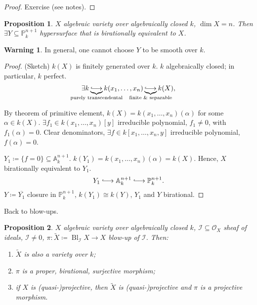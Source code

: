 \documentclass[12pt]{article}
\DeclareMathOperator{\Bl}{Bl}
\newtheorem*{proposition}{Proposition}
\theoremstyle{definition}
\newtheorem*{warning}{Warning}
\begin{document}
\begin{proof}
Exercise (see notes).
\end{proof}

\begin{proposition}
$X$ algebraic variety over algebraically closed $k$, $\dim X=n$. Then $\exists Y\subseteq\mathbb P_k^{n+1}$ hypersurface that is birationally equivalent to $X$.
\end{proposition}

\begin{warning}
In general, one cannot choose $Y$ to be smooth over $k$.
\end{warning}

\begin{proof}
(Sketch) $k(X)$ is finitely generated over $k$. $k$ algebraically closed; in particular, $k$ perfect.
\[\exists k\underbrace{\lhook\joinrel\longrightarrow}_{\mathclap{\text{purely transcendental}}}k(x_1,\ldots,x_n)\underbrace{\lhook\joinrel\longrightarrow}_{\mathclap{\text{finite \& separable}}}k(X),\]

By theorem of primitive element, $k(X)=k(x_1,\ldots,x_n)(\alpha)$ for some $\alpha\in k(X)$. $\exists f_1\in k(x_1,\ldots,x_n)[y]$ irreducible polynomial, $f_1\neq0$, with $f_1(\alpha)=0$. Clear denominators, $\exists f\in k[x_1,\ldots,x_n,y]$ irreducible polynomial, $f(\alpha)=0$.

$Y_1\coloneqq\{f=0\}\subseteq\mathbb A_k^{n+1}$. $k(Y_1)=k(x_1,\ldots,x_n)(\alpha)=k(X)$. Hence, $X$ birationally equivalent to $Y_1$.
\[Y_1\lhook\joinrel\longrightarrow\mathbb A_k^{n+1}\lhook\joinrel\longrightarrow\mathbb P_k^{n+1}.\]
$Y\coloneqq\overline{Y_1}$ closure in $\mathbb P_k^{n+1}$, $k(Y_1)\cong k(Y)$, $Y_1$ and $Y$ birational.
\end{proof}

Back to blow-ups.

\begin{proposition}
$X$ algebraic variety over algebraically closed $k$, $\mathcal I\subseteq\mathcal O_X$ sheaf of ideals, $\mathcal I\neq0$, $\pi:\widetilde X\coloneqq\Bl_\mathcal IX\rightarrow X$ blow-up of $\mathcal I$. Then:
\begin{enumerate}[label=\arabic*)]
\item $\widetilde X$ is also a variety over $k$;
\item $\pi$ is a proper, birational, surjective morphism;
\item if $X$ is (quasi-)projective, then $\widetilde X$ is (quasi-)projective and $\pi$ is a projective morphism.
\end{enumerate}
\end{proposition}
\end{document}
